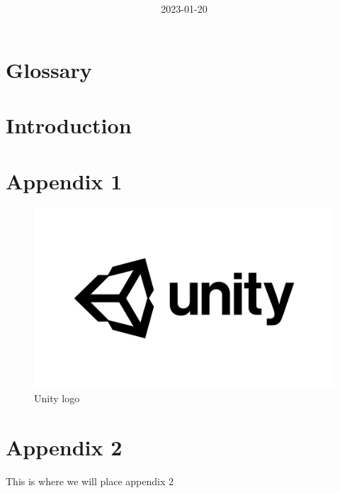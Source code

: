 \documentclass[titlepage]{article}
\title{%
    \Huge \project
}
\author{
    \martin \and \felix \and \hannes
    \and \arvid \and \marcus \and \jakob
}
\date{2023-01-20}
\begin{document}
\maketitle
\newpage

\tableofcontents
\thispagestyle{plain}
\newpage

\section*{Glossary}
    
\thispagestyle{plain}
\newpage

\section{Introduction}
    





\appendix
    \section{Appendix 1}
        \begin{figure}[H]
        \centering
        \includegraphics[scale=0.2]{appendix/Unity.jpg}
        \caption{Unity logo}
        \label{fig:unity}
    \end{figure}

    \section{Appendix 2}
        This is where we will place appendix 2
\end{document}
